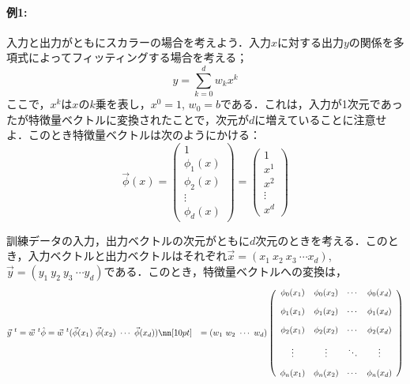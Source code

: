 \paragraph{例1:}
入力と出力がともにスカラーの場合を考えよう．入力$x$に対する出力$y$の関係を多項式によってフィッティングする場合を考える；
\begin{equation}
    y = \sum_{k=0}^{d} w_k x^{k}
\end{equation}
ここで，$x^{k}$は$x$の$k$乗を表し，$x^0=1$, $w_0=b$である．これは，入力が1次元であったが特徴量ベクトルに変換されたことで，次元が$d$に増えていることに注意せよ．このとき特徴量ベクトルは次のようにかける：
\begin{equation}
     \vec{\phi}(x)=\left(
        \begin{array}{c}
       1\\[10pt]
       \phi_1(x)\\[10pt]
       \phi_2(x)\\[10pt]
       \vdots\\[10pt]
       \phi_d(x)
        \end{array}
        \right)
        =\left(
        \begin{array}{c}
       1\\[10pt]
       x^1\\[10pt]
       x^2\\[10pt]
       \vdots\\[10pt]
       x^d
        \end{array}
        \right)
\end{equation}

訓練データの入力，出力ベクトルの次元がともに$d$次元のときを考える．このとき，入力ベクトルと出力ベクトルはそれぞれ$\vec{x}=(x_1\ x_2\ x_3\ \cdots x_d)$, $\vec{y}=(y_1\ y_2\ y_3\ \cdots y_d)$である．このとき，特徴量ベクトルへの変換は，
\begin{align}
    \vec{y}^{\ t}
    &=\vec{w}^{\ t}\hat{\phi}
    =\vec{w}^{\ t} (\vec{\phi}(x_1)\ \vec{\phi}(x_2)\ \cdots\ \vec{\phi}(x_d))\nn[10pt]
    &=(w_1\ w_2\ \cdots\ w_d)
    \left(
        \begin{array}{cccc}
       \phi_0(x_1)&\phi_0(x_2)&\cdots&\phi_0(x_d)\\[10pt]
       \phi_1(x_1)&\phi_1(x_2)&\cdots&\phi_1(x_d)\\[10pt]
       \phi_2(x_1)&\phi_2(x_2)&\cdots&\phi_2(x_d)\\[10pt]
       \vdots&\vdots&\ddots&\vdots\\[10pt]
       \phi_n(x_1)&\phi_n(x_2)&\cdots&\phi_n(x_d)
        \end{array}
    \right)
\end{align}

